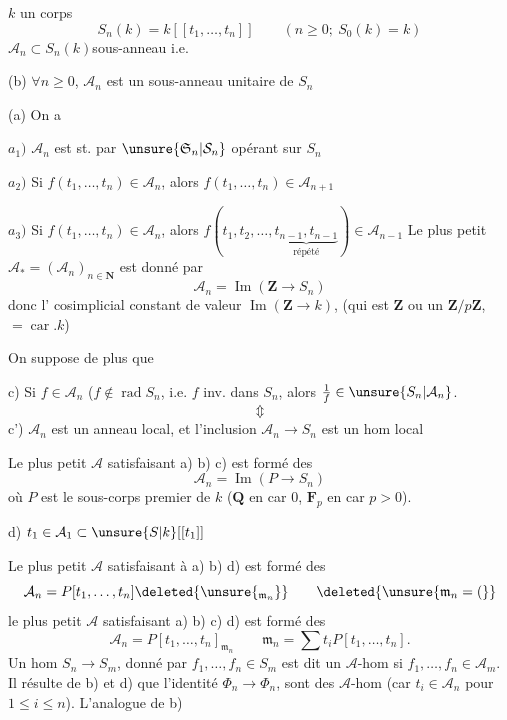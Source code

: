 $k$ un  corps
\[
S_n(k)=k[[t_1,\ldots,t_n]]\qquad(n\ge0;\ S_0(k)=k)
\]
$\mathcal A_n\subset S_n(k)$\qquad sous-anneau  i.e.

(b) $\forall n\ge0$, $\mathcal A_n$ est un sous-anneau unitaire de $S_n$

(a) On a

$a_1)$ $\mathcal A_n$ est st. par $\unsure{\mathfrak S_n|\mathcal S_n}$ opérant sur $S_n$

$a_2)$ Si $f(t_1,\ldots,t_n)\in\mathcal A_n$, alors $f(t_1,\ldots,t_n)\in\mathcal A_{n+1}$

$a_3)$ Si $f(t_1,\ldots,t_n)\in\mathcal A_n$, alors $f(t_1,t_2,\ldots,\underbrace{t_{n-1},t_{n-1}}_{\text{répété}})\in\mathcal A_{n-1}$
Le plus petit $\mathcal A_*=(\mathcal A_n)_{n\in\mathbf N}$  est donné par 
\[
\mathcal A_n=\operatorname{Im}(\mathbf Z\longrightarrow S_n)
\]
donc l' cosimplicial constant de valeur $\operatorname{Im}(\mathbf Z\to k)$,
(qui est $\mathbf Z$ ou un $\mathbf Z/p\mathbf Z$,  $=\operatorname{car}.k$)

On suppose de plus que

c) Si $f\in\mathcal A_n$ ($f\notin\operatorname{rad}S_n$, i.e. $f$ inv. dans $S_n$, alors $\frac1f\in\unsure{S_n|\mathcal A_n}$.
\[
\Updownarrow
\]
c') $\mathcal A_n$ est un anneau local, et l'inclusion $\mathcal A_n\to S_n$ est un hom local

Le plus petit $\mathcal A$ satisfaisant a) b) c) est formé des
\[
\mathcal A_n=\operatorname{Im}(P\longrightarrow S_n)
\]
où $P$ est le sous-corps premier de $k$ ($\mathbf Q$ en car $0$, $\mathbf F_p$ en car $p>0$).

d) $t_1\in\mathcal A_1\subset\unsure{S|k}[[t_1]]$

Le plus petit $\mathcal A$ satisfaisant à a) b) d)  est formé des
\[
\mathcal A_n=P[t_1,\ldots,t_n]\deleted{\unsure{_{\mathfrak m_n}}}\qquad\deleted{\unsure{\mathfrak m_n=(}}
\]
le plus petit $\mathcal A$ satisfaisant a) b) c) d) est formé des
\[
\mathcal A_n=P[t_1,\ldots,t_n]_{\mathfrak m_n}\qquad\mathfrak m_n=\sum t_i P[t_1,\ldots,t_n].
\]
\deleted{\unsure{$\Phi$}}
Un hom $S_n\longrightarrow S_m$, donné par $f_1,\ldots,f_n\in S_m$ est dit un $\mathcal A$-hom si $f_1,\ldots,f_n\in\mathcal A_m$. Il résulte de b) et d) que l'identité $\Phi_n\longrightarrow\Phi_n$,  sont des $\mathcal A$-hom (car $t_i\in\mathcal A_n$ pour $1\le i\le n$). L'analogue de b)


